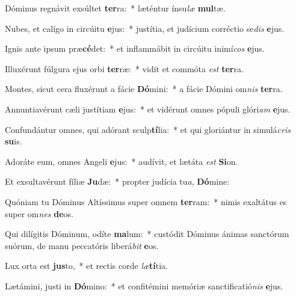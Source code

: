 \item Dóminus regnávit exsúltet \textbf{ter}ra:~* læténtur ínsu\textit{læ} \textbf{mul}tæ.
\item Nubes, et calígo in circúitu \textbf{e}jus:~* justítia, et judícium corréctio se\textit{dis} \textbf{e}jus.
\item Ignis ante ipsum præ\textbf{cé}det:~* et inflammábit in circúitu inimí\textit{cos} \textbf{e}jus.
\item Illuxérunt fúlgura ejus orbi \textbf{ter}ræ:~* vidit et commóta \textit{est} \textbf{ter}ra.
\item Montes, sicut cera fluxérunt a fácie \textbf{Dó}mini:~* a fácie Dómini om\textit{nis} \textbf{ter}ra.
\item Annuntiavérunt cæli justítiam \textbf{e}jus:~* et vidérunt omnes pópuli glóri\textit{am} \textbf{e}jus.
\item Confundántur omnes, qui adórant sculp\textbf{tí}lia:~* et qui gloriántur in simulá\textit{cris} \textbf{su}is.
\item Adoráte eum, omnes Angeli \textbf{e}jus:~* audívit, et lætáta \textit{est} \textbf{Si}on.
\item Et exsultavérunt fíliæ \textbf{Ju}dæ:~* propter judícia tu\textit{a}, \textbf{Dó}mine:
\item Quóniam tu Dóminus Altíssimus super omnem \textbf{ter}ram:~* nimis exaltátus es super om\textit{nes} \textbf{de}os.
\item Qui dilígitis Dóminum, odíte \textbf{ma}lum:~* custódit Dóminus ánimas sanctórum suórum, de manu peccatóris liberá\textit{bit} \textbf{e}os.
\item Lux orta est \textbf{jus}to,~* et rectis corde \textit{læ}\textbf{tí}tia.
\item Lætámini, justi in \textbf{Dó}mino:~* et confitémini memóriæ sanctificatió\textit{nis} \textbf{e}jus.
